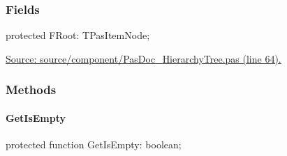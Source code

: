 \documentclass{report}
\newif\ifpdf
\begin{document}
\subsubsection*{\large{\textbf{Fields}}\normalsize\hspace{1ex}\hfill}
\begin{list}{}{
\setlength{\itemindent}{0cm}
\setlength{\listparindent}{0cm}
\setlength{\leftmargin}{\evensidemargin}
\addtolength{\leftmargin}{\tmplength}
\settowidth{\labelsep}{X}
\addtolength{\leftmargin}{\labelsep}
\setlength{\labelwidth}{\tmplength}
}
\label{PasDoc_HierarchyTree.TStringCardinalTree-FRoot}
\item[\textbf{FRoot}\hfill]
\ifpdf
\begin{flushleft}
\fi
\begin{ttfamily}
protected FRoot: TPasItemNode;\end{ttfamily}

\ifpdf
\end{flushleft}
\fi


\par  \par
\href{https://github.com/pasdoc/pasdoc/blob/master/source/component/PasDoc_HierarchyTree.pas#L64}{Source: source/component/PasDoc{\_}HierarchyTree.pas (line 64).}\end{list}
\subsubsection*{\large{\textbf{Methods}}\normalsize\hspace{1ex}\hfill}
\paragraph*{GetIsEmpty}\hspace*{\fill}

\label{PasDoc_HierarchyTree.TStringCardinalTree-GetIsEmpty}
\begin{list}{}{
\setlength{\itemindent}{0cm}
\setlength{\listparindent}{0cm}
\setlength{\leftmargin}{\evensidemargin}
\addtolength{\leftmargin}{\tmplength}
\settowidth{\labelsep}{X}
\addtolength{\leftmargin}{\labelsep}
\setlength{\labelwidth}{\tmplength}
}
\item[\textbf{Declaration}\hfill]
\ifpdf
\begin{flushleft}
\fi
\begin{ttfamily}
protected function GetIsEmpty: boolean;\end{ttfamily}

\ifpdf
\end{flushleft}
\fi

\end{list}
\end{document}
